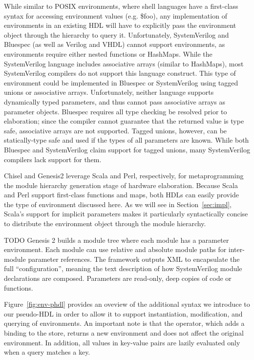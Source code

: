 While similar to POSIX environments, where shell languages have a first-class syntax for accessing environment values (e.g. \$foo),
any implementation of environments in an existing HDL will have to explicitly pass the environment object through the hierarchy to query it.
Unfortunately, SystemVerilog and Bluespec (as well as Verilog and VHDL) cannot support environments, as environments require either nested functions or HashMaps.
While the SystemVerilog language includes associative arrays (similar to HashMaps), most SystemVerilog compilers do not support this language construct. 
This type of environment could be implemented in Bluespec or SystemVerilog using tagged unions or associative arrays.
Unfortunately, neither language supports dynamically typed parameters, and thus cannot pass associative arrays as parameter objects.
Bluespec requires all type checking be resolved prior to elaboration; since the compiler cannot guarantee that the returned value is type safe, associative arrays are not supported. 
Tagged unions, however, can be statically-type safe and used if the types of all parameters are known.
While both Bluespec and SystemVerilog claim support for tagged unions, many SystemVerilog compilers lack support for them.

Chisel and Genesis2 leverage Scala and Perl, respectively, for metaprogramming the module hierarchy generation stage of hardware elaboration.
Because Scala and Perl support first-class functions and maps, both HDLs can easily provide the type of environment discussed here.
As we will see in Section~\ref{sec:impl}, Scala's support for implicit parameters makes it particularly syntactically concise to distribute
the environment object through the module hierarchy.

TODO Genesis 2 builds a module tree where each module has a parameter environment.
\cite{shacham2011chip}
Each module can use relative and absolute module paths for inter-module parameter references. 
The framework outputs XML to encapsulate the full ``configuration'', meaning the text description of how SystemVerilog module declarations are composed.
Parameters are read-only, deep copies of code or functions.

Figure~\ref{fig:env-phdl} provides an oveview of the additional syntax we introduce to our pseudo-HDL in order to allow it to support instantiation, modification, and querying of environments.
An important note is that the \code{++} operator, which adds a binding to the store, returns a new environment and does not affect the original environment.
In addition, all values in key-value pairs are lazily evaluated only when a query matches a key.


